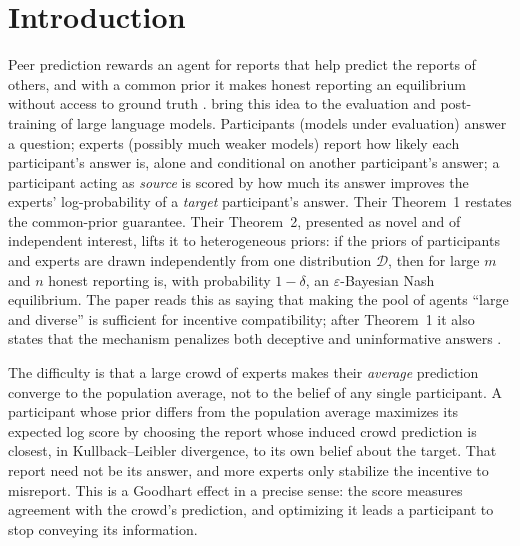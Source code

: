 \documentclass[11pt]{article}
\theoremstyle{remark}
\newcommand{\cD}{\mathcal{D}}
\begin{document}
\section{Introduction}

Peer prediction rewards an agent for reports that help predict the reports of others, and with a common prior it makes honest reporting an equilibrium without access to ground truth \citep{miller2005peer,schoenebeck2022two}. \citet{qiu2026truthfulness} bring this idea to the evaluation and post-training of large language models. Participants (models under evaluation) answer a question; experts (possibly much weaker models) report how likely each participant's answer is, alone and conditional on another participant's answer; a participant acting as \emph{source} is scored by how much its answer improves the experts' log-probability of a \emph{target} participant's answer. Their Theorem~1 restates the common-prior guarantee. Their Theorem~2, presented as novel and of independent interest, lifts it to heterogeneous priors: if the priors of participants and experts are drawn independently from one distribution $\cD$, then for large $m$ and $n$ honest reporting is, with probability $1-\delta$, an $\varepsilon$-Bayesian Nash equilibrium. The paper reads this as saying that making the pool of agents ``large and diverse'' is sufficient for incentive compatibility; after Theorem~1 it also states that the mechanism penalizes both deceptive and uninformative answers \citep[Sec.~3.3]{qiu2026truthfulness}.

The difficulty is that a large crowd of experts makes their \emph{average} prediction converge to the population average, not to the belief of any single participant. A participant whose prior differs from the population average maximizes its expected log score by choosing the report whose induced crowd prediction is closest, in Kullback--Leibler divergence, to its own belief about the target. That report need not be its answer, and more experts only stabilize the incentive to misreport. This is a Goodhart effect \citep{goodhart1975problems,strathern1997improving} in a precise sense: the score measures agreement with the crowd's prediction, and optimizing it leads a participant to stop conveying its information.
\end{document}
